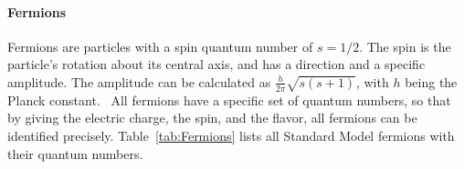 \paragraph{Fermions}
Fermions are particles with a spin quantum number of $s = 1/2$. 
The spin is the particle's rotation about its central axis, and has a direction and a specific amplitude.
The amplitude can be calculated as $\frac{h}{2\pi}\sqrt{s(s+1)}$, with $h$ being the Planck constant.~\cite[p. 121]{Griffiths}
All fermions have a specific set of quantum numbers, so that by giving the electric charge, the spin, and the flavor, all fermions can be identified precisely.
Table~\ref{tab:Fermions} lists all Standard Model fermions with their quantum numbers.
